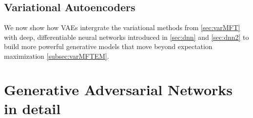 \subsection{Variational Autoencoders}
\label{subsec:vaeGanVAEs}
We now show how VAEs intergrate the variational methods from \ref{sec:varMFT} with deep, differentiable neural networks introduced in \ref{sec:dnn} and \ref{sec:dnn2} to build more powerful generative models that move beyond expectation maximization \ref{subsec:varMFTEM}.
























\section{Generative Adversarial Networks in detail}
\label{sec:gan}


























 